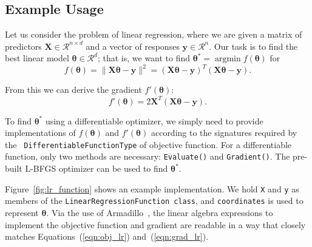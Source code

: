 \subsection{Example Usage}
\label{sec:linreg_example}

Let us consider the problem of linear regression, where we are
given a matrix of predictors $\bm X \in \mathcal{R}^{n \times d}$ and a vector
of responses $\bm y \in \mathcal{R}^n$.  Our task is to find the best linear
model $\bm \theta \in \mathcal{R}^d$; that is, we want to find $\bm \theta^* =
\operatorname{argmin} f(\bm \theta)$ for
%
\begin{equation}
f(\bm \theta) = \| \bm X \bm \theta - \bm y \|^2 = (\bm X \bm \theta - \bm y)^T
(\bm X \bm \theta - \bm y).
\label{eqn:obj_lr}
\end{equation}

\noindent
From this we can derive the gradient $f'(\bm \theta)$:
%
\begin{equation}
f'(\bm \theta) = 2 \bm X^T (\bm X \bm \theta - \bm y).
\label{eqn:grad_lr}
\end{equation}

To find $\bm \theta^*$ using a differentiable
optimizer, we simply need to provide implementations of $f(\bm \theta)$ and
$f'(\bm \theta)$ according to the signatures required by the {\tt
DifferentiableFunctionType} of objective function.  For a differentiable
function, only two methods are necessary: {\tt Evaluate()} and {\tt Gradient()}.
The pre-built L-BFGS optimizer can be used to find $\bm \theta^*$.

Figure~\ref{fig:lr_function} shows an example implementation.
We hold {\tt X} and {\tt y} as members of the
{\tt LinearRegressionFunction class},
and {\tt coordinates} is used to represent $\bm \theta$.
Via the use of Armadillo~\cite{sanderson2016armadillo},
the linear algebra expressions to implement the objective function and gradient
are readable in a way that closely matches Equations~(\ref{eqn:obj_lr}) and~(\ref{eqn:grad_lr}).





